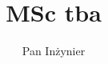\documentclass[twoside,12pt]{book}
\title{MSc tba}
\author{Pan Inżynier}
\begin{document}
\makeatletter
\def\ps@plain{%
  \let\@mkboth\@gobbletwo
  \let\ps@normal\hf@plain
  \let\ps@opening\hf@plain
  \let\ps@closing\hf@plain
  \let\ps@blank\hf@empty
  \ps@normal}
\makeatother




\tableofcontents





\nocite{*}

\listoffigures
\listoftables
\end{document}
